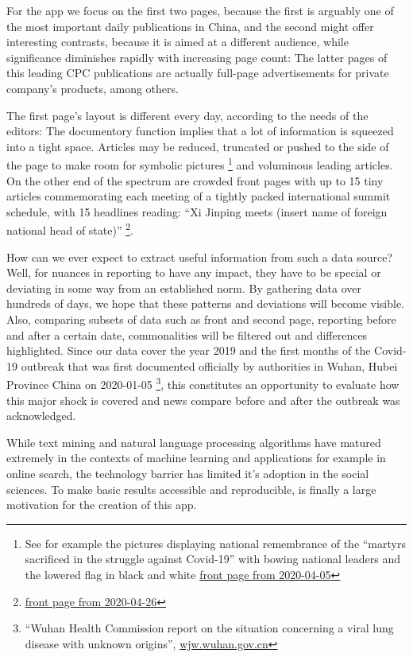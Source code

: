 \documentclass[12pt,a4paper]{article}
\let\rmarkdownfootnote\footnote%
\def\footnote{\protect\rmarkdownfootnote}
\begin{document}
For the app we focus on the first two pages, because the first is arguably one of the most important daily publications in China, and the second might offer interesting contrasts, because it is aimed at a different audience, while significance diminishes rapidly with increasing page count: The latter pages of this leading CPC publications are actually full-page advertisements for private company's products, among others.

The first page's layout is different every day, according to the needs of the editors: The documentory function implies that a lot of information is squeezed into a tight space. Articles may be reduced, truncated or pushed to the side of the page to make room for symbolic pictures \footnote{See for example the pictures displaying national remembrance of the ``martyrs sacrificed in the struggle against Covid-19'' with bowing national leaders and the lowered flag in black and white \href{http://paper.people.com.cn/rmrb/html/2020-04/05/nw.D110000renmrb_20200405_1-01.htm}{front page from 2020-04-05}} and voluminous leading articles. On the other end of the spectrum are crowded front pages with up to 15 tiny articles commemorating each meeting of a tightly packed international summit schedule, with 15 headlines reading: ``Xi Jinping meets (insert name of foreign national head of state)'' \footnote{\href{http://paper.people.com.cn/rmrb/html/2019-04/26/nbs.D110000renmrb_01.htm}{front page from 2020-04-26}}.

How can we ever expect to extract useful information from such a data source? Well, for nuances in reporting to have any impact, they have to be special or deviating in some way from an established norm. By gathering data over hundreds of days, we hope that these patterns and deviations will become visible. Also, comparing subsets of data such as front and second page, reporting before and after a certain date, commonalities will be filtered out and differences highlighted. Since our data cover the year 2019 and the first months of the Covid-19 outbreak that was first documented officially by authorities in Wuhan, Hubei Province China on 2020-01-05 \footnote{``Wuhan Health Commission report on the situation concerning a viral lung disease with unknown origins'', \href{http://wjw.wuhan.gov.cn/front/web/showDetail/2020010509020}{wjw.wuhan.gov.cn}}, this constitutes an opportunity to evaluate how this major shock is covered and news compare before and after the outbreak was acknowledged.

While text mining and natural language processing algorithms have matured extremely in the contexts of machine learning and applications for example in online search, the technology barrier has limited it's adoption in the social sciences. To make basic results accessible and reproducible, is finally a large motivation for the creation of this app.
\end{document}
